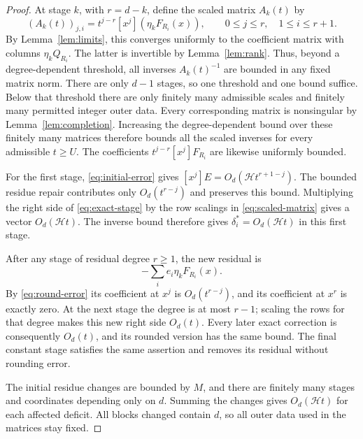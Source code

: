 \documentclass[11pt,a4paper]{article}
\theoremstyle{definition}
\newcommand{\htf}{\mathcal H}
\begin{document}
\begin{proof}
At stage $k$, with $r=d-k$, define the scaled matrix $A_k(t)$ by
\begin{equation}\label{eq:scaled-matrix}
 (A_k(t))_{j,i}=t^{j-r}[x^j](\eta_k F_{R_i}(x)),
 \qquad 0\le j\le r,\quad 1\le i\le r+1.
\end{equation}
By Lemma~\ref{lem:limits}, this converges uniformly to the coefficient
matrix with columns $\eta_kQ_{R_i}$. The latter is invertible by
Lemma~\ref{lem:rank}. Thus, beyond a degree-dependent threshold, all
inverses $A_k(t)^{-1}$ are bounded in any fixed matrix norm.
There are only $d-1$ stages, so one threshold and one bound suffice.
Below that threshold there are only finitely many admissible scales
and finitely many permitted integer outer data. Every corresponding
matrix is nonsingular by Lemma~\ref{lem:completion}. Increasing the
degree-dependent bound over these finitely many matrices therefore
bounds all the scaled inverses for every admissible $t\ge U$.
The coefficients $t^{j-r}[x^j]F_{R_i}$ are likewise uniformly bounded.

For the first stage, \eqref{eq:initial-error} gives
$[x^j]E=O_d(\htf t^{r+1-j})$.
The bounded residue repair contributes only $O_d(t^{r-j})$ and
preserves this bound. Multiplying the right side of
\eqref{eq:exact-stage} by the row scalings in
\eqref{eq:scaled-matrix} gives a vector $O_d(\htf t)$.
The inverse bound therefore gives
$\delta_i^*=O_d(\htf t)$ in this first stage.

After any stage of residual degree $r\ge1$, the new residual is
\[
 -\sum_i e_i\eta_kF_{R_i}(x).
\]
By \eqref{eq:round-error} its coefficient at $x^j$ is
$O_d(t^{r-j})$, and its coefficient at $x^r$ is exactly zero.
At the next stage the degree is at most $r-1$; scaling the rows for
that degree makes this new right side $O_d(t)$.
Every later exact correction is consequently $O_d(t)$, and its rounded
version has the same bound. The final constant stage satisfies the
same assertion and removes its residual without rounding error.

The initial residue changes are bounded by $M$, and there are finitely
many stages and coordinates depending only on $d$. Summing the changes
gives $O_d(\htf t)$ for each affected deficit. All blocks changed
contain $d$, so all outer data used in the matrices stay fixed.
\end{proof}
\end{document}

